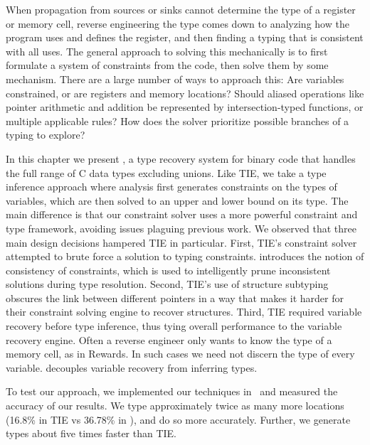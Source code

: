 When propagation from sources or sinks cannot determine the type of a register or memory cell, reverse engineering the type comes down to analyzing how the program uses and defines the register, and then finding a typing that is consistent with all uses. The general approach to solving this mechanically is to first formulate a system of constraints from the code, then solve them by some mechanism. There are a large number of ways to approach this: Are variables constrained, or are registers and memory locations? Should aliased operations like pointer arithmetic and addition be represented by intersection-typed functions, or multiple applicable rules? How does the solver prioritize possible branches of a typing to explore?


In this chapter we present \bitr, a type recovery system for binary code that handles the full range of C data types excluding unions. Like TIE, we take a type inference approach where analysis first generates constraints on the types of variables, which are then solved to an upper and lower bound on its type. The main difference is that our constraint solver uses a more powerful constraint and type framework, avoiding issues plaguing previous work. We observed that three main design decisions hampered TIE in particular. First, TIE's constraint solver attempted to brute force a solution to typing constraints. \bitr{} introduces the notion of consistency of constraints, which is used to intelligently prune inconsistent solutions during type resolution.  Second, TIE's use of structure subtyping obscures the link between different pointers in a way that makes it harder for their constraint solving engine to recover structures. Third, TIE required variable recovery before type inference, thus tying overall performance to the variable recovery engine. Often a reverse engineer only wants to know the type of a memory cell, as in Rewards.  In such cases we need not discern the type of every variable. \bitr{} decouples variable recovery from inferring types.


  To test our approach, we implemented our techniques in \bitr\ and measured the accuracy of our results. We type approximately twice as many more locations (16.8\% in TIE vs 36.78\% in \bitr), and do so more accurately. Further, we generate types about five times faster than TIE.


